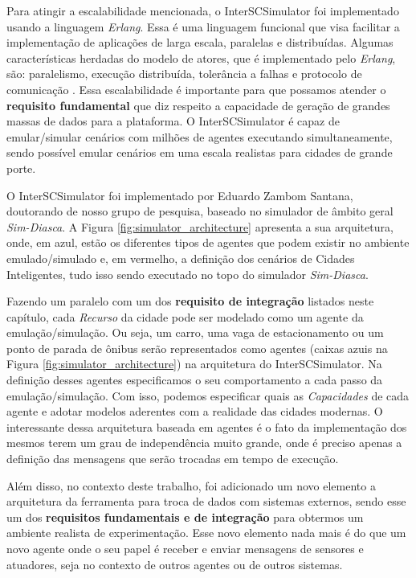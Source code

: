 Para atingir a escalabilidade mencionada, o InterSCSimulator foi implementado usando a linguagem \textit{Erlang}.
Essa é uma linguagem funcional que visa facilitar a implementação de aplicações de larga escala, paralelas e distribuídas.
Algumas características herdadas do modelo de atores, que é implementado pelo \textit{Erlang}, são: paralelismo, execução distribuída, tolerância a falhas e
protocolo de comunicação \cite{santana_17}.
Essa escalabilidade é importante para que possamos atender o \textbf{requisito fundamental} que diz respeito a capacidade de geração de grandes massas de dados
para a plataforma.
O InterSCSimulator é capaz de emular/simular cenários com milhões de agentes executando simultaneamente, sendo possível emular cenários em uma escala realistas para
cidades de grande porte.

O InterSCSimulator foi implementado por Eduardo Zambom Santana, doutorando de nosso grupo de pesquisa, baseado no simulador de âmbito geral \textit{Sim-Diasca}.
A Figura \ref{fig:simulator_architecture} apresenta a sua arquitetura, onde, em azul, estão os diferentes tipos de agentes que podem existir no ambiente
emulado/simulado e, em vermelho, a definição dos cenários de Cidades Inteligentes, tudo isso sendo executado no topo do simulador \textit{Sim-Diasca}.


Fazendo um paralelo com um dos \textbf{requisito de integração} listados neste capítulo, cada \textit{Recurso} da cidade pode ser modelado como um agente da emulação/simulação.
Ou seja, um carro, uma vaga de estacionamento ou um ponto de parada de ônibus serão representados como agentes (caixas azuis na Figura \ref{fig:simulator_architecture})
na arquitetura do InterSCSimulator.
Na definição desses agentes especificamos o seu comportamento a cada passo da emulação/simulação.
Com isso, podemos especificar quais as \textit{Capacidades} de cada agente e adotar modelos aderentes com a realidade das cidades modernas.
O interessante dessa arquitetura baseada em agentes é o fato da implementação dos mesmos terem um grau de independência muito grande, onde é preciso apenas a definição
das mensagens que serão trocadas em tempo de execução.

Além disso, no contexto deste trabalho, foi adicionado um novo elemento a arquitetura da ferramenta para troca de dados com sistemas externos,
sendo esse um dos \textbf{requisitos fundamentais e de integração} para obtermos um ambiente realista de experimentação.
Esse novo elemento nada mais é do que um novo agente onde o seu papel é receber e enviar mensagens de sensores e atuadores, seja no contexto de outros agentes ou de
outros sistemas.

